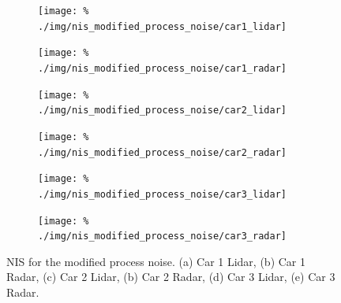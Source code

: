 \documentclass{scrartcl}
\begin{document}
\begin{figure}[!ht]
	\centering
	\begin{subfigure}[c]{0.45\columnwidth}
		\texttt{[image: \%
			./img/nis\_modified\_process\_noise/car1\_lidar]}
	\end{subfigure}
	\begin{subfigure}[c]{0.45\columnwidth}
		\texttt{[image: \%
			./img/nis\_modified\_process\_noise/car1\_radar]}
	\end{subfigure}
	\begin{subfigure}[c]{0.45\columnwidth}
		\texttt{[image: \%
			./img/nis\_modified\_process\_noise/car2\_lidar]}
	\end{subfigure}
	\begin{subfigure}[c]{0.45\columnwidth}
		\texttt{[image: \%
			./img/nis\_modified\_process\_noise/car2\_radar]}
	\end{subfigure}
	\begin{subfigure}[c]{0.45\columnwidth}
		\texttt{[image: \%
			./img/nis\_modified\_process\_noise/car3\_lidar]}
	\end{subfigure}
	\begin{subfigure}[c]{0.45\columnwidth}
		\texttt{[image: \%
			./img/nis\_modified\_process\_noise/car3\_radar]}
	\end{subfigure}
	\caption{NIS for the modified process noise.
	(a) Car 1 Lidar, (b) Car 1 Radar,
	(c) Car 2 Lidar, (b) Car 2 Radar,
	(d) Car 3 Lidar, (e) Car 3 Radar.}
	\label{fig:nis:modified_process_noise}
\end{figure}
\end{document}
